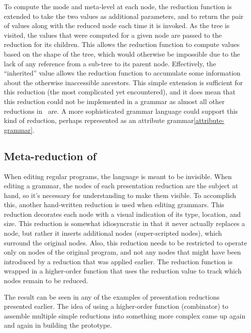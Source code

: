 To compute the mode and meta-level at each node, the reduction function is extended to take the two values as additional parameters, and to return the pair of values along with the reduced node each time it is invoked. As the tree is visited, the values that were computed for a given node are passed to the reduction for its children. This allows the reduction function to compute values based on the shape of the tree, which would otherwise be impossible due to the lack of any reference from a sub-tree to its parent node. Effectively, the ``inherited'' value allows the reduction function to accumulate some information about the otherwise inaccessible ancestors. This simple extension is sufficient for this reduction (the most complicated yet encountered), and it does mean that this reduction could not be implemented in a grammar as almost all other reductions in \Meta\ are. A more sophisticated grammar language could support this kind of reduction, perhaps represented as an attribute grammar\ref{attribute-grammar}.


\subsection{Meta-reduction of }
When editing regular programs, the  language is meant to be invisible. When editing a grammar, the  nodes of each presentation reduction are the subject at hand, so it's necessary for understanding to make them visible. To accomplish this, another hand-written reduction is used when editing grammars. This reduction decorates each node with a visual indication of its type, location, and size. This reduction is somewhat idiosyncratic in that it never actually replaces a node, but rather it inserts additional nodes (super-scripted  nodes), which surround the original nodes. Also, this reduction needs to be restricted to operate only on  nodes of the original program, and not any nodes that might have been introduced by a reduction that was applied earlier. The reduction function is wrapped in a higher-order function that uses the reduction value to track which nodes remain to be reduced.

The result can be seen in any of the examples of presentation reductions presented earlier. The idea of using a higher-order function (combinator) to assemble multiple simple reductions into something more complex came up again and again in building the prototype.


